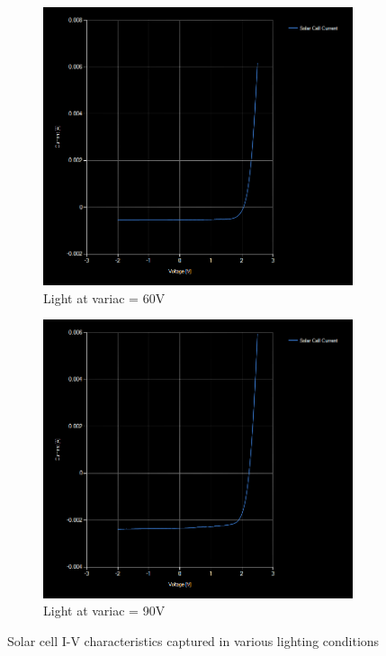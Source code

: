 \begin{figure}[ht]
\begin{subfigure}[b]{0.5\linewidth}
    \vspace{4ex}
  \end{subfigure} 
  \begin{subfigure}[b]{0.5\linewidth}
    \centering
    \includegraphics[width=0.90\linewidth]{figures/60VChar.png} 
    \caption{Light at variac = 60V} 
    \label{fig:60} 
  \end{subfigure}%
  \begin{subfigure}[b]{0.5\linewidth}
    \centering
    \includegraphics[width=0.90\linewidth]{figures/90VChar.png} 
    \caption{Light at variac = 90V} 
    \label{fig:90} 
  \end{subfigure} 
  \caption{Solar cell I-V characteristics captured in various lighting conditions}
  \label{fig:IV} 
\end{figure}

